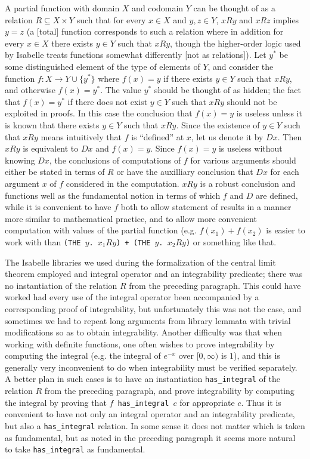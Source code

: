 \documentclass{amsart}
\theoremstyle{definition}
\theoremstyle{remark}
\begin{document}
A partial function with domain $X$ and codomain $Y$ can be thought of as a relation $R \subseteq X \times Y$ such that for every $x \in X$ and $y, z \in Y$, $xRy$ and $xRz$ implies $y=z$ (a [total] function corresponds to such a relation where in addition for every $x \in X$ there exists $y \in Y$ such that $xRy$, though the higher-order logic used by Isabelle treats functions somewhat differently [not as relations]). Let $y^*$ be some distinguished element of the type of elements of $Y$, and consider the function $f\colon X \rightarrow Y \cup \{y^*\}$ where $f(x) = y$ if there exists $y \in Y$ such that $xRy$, and otherwise $f(x) = y^*$. The value $y^*$ should be thought of as hidden; the fact that $f(x) = y^*$ if there does not exist $y \in Y$ such that $xRy$ should not be exploited in proofs. In this case the conclusion that $f(x) = y$ is useless unless it is known that there exists $y \in Y$ such that $xRy$. Since the existence of $y \in Y$ such that $xRy$ means intuitively that $f$ is ``defined'' at $x$, let us denote it by $Dx$. Then $xRy$ is equivalent to $Dx$ and $f(x) = y$. Since $f(x) = y$ is useless without knowing $Dx$, the conclusions of computations of $f$ for various arguments should either be stated in terms of $R$ or have the auxilliary conclusion that $Dx$ for each argument $x$ of $f$ considered in the computation. $xRy$ is a robust conclusion and functions well as the fundamental notion in terms of which $f$ and $D$ are defined, while it is convenient to have $f$ both to allow statement of results in a manner more similar to mathematical practice, and to allow more convenient computation with values of the partial function (e.g. $f(x_1) + f(x_2)$ is easier to work with than \texttt{(THE $y$.\!\!\! $x_1Ry$) + (THE $y$.\!\!\! $x_2Ry$)} or something like that.

The Isabelle libraries we used during the formalization of the central limit theorem employed and integral operator and an integrability predicate; there was no instantiation of the relation $R$ from the preceding paragraph. This could have worked had every use of the integral operator been accompanied by a corresponding proof of integrability, but unfortunately this was not the case, and sometimes we had to repeat long arguments from library lemmata with trivial modifications so as to obtain integrability. Another difficulty was that when working with definite functions, one often wishes to prove integrability by computing the integral (e.g. the integral of $e^{-x}$ over $[0, \infty)$ is $1$), and this is generally very inconvenient to do when integrability must be verified separately. A better plan in such cases is to have an instantiation \texttt{has\_integral} of the relation $R$ from the preceding paragraph, and prove integrability by computing the integral by proving that \texttt{$f$ has\_integral $c$} for appropriate $c$. Thus it is convenient to have not only an integral operator and an integrability predicate, but also a \texttt{has\_integral} relation. In some sense it does not matter which is taken as fundamental, but as noted in the preceding paragraph it seems more natural to take \texttt{has\_integral} as fundamental.
\end{document}
